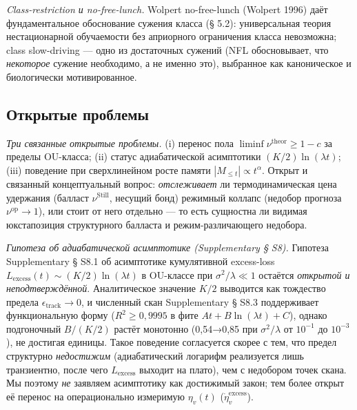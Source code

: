 \documentclass[pdflatex,sn-mathphys-ay]{sn-jnl}
\begin{document}
\emph{Class-restriction и no-free-lunch.} Wolpert no-free-lunch (Wolpert 1996) даёт фундаментальное обоснование сужения класса (§ 5.2): универсальная теория нестационарной обучаемости без априорного ограничения класса невозможна; class slow-driving --- одно из достаточных сужений (NFL обосновывает, что \emph{некоторое} сужение необходимо, а не именно это), выбранное как каноническое и биологически мотивированное.



\subsection{Открытые проблемы}\label{ux43eux442ux43aux440ux44bux442ux44bux435-ux43fux440ux43eux431ux43bux435ux43cux44b}



\emph{Три связанные открытые проблемы.} (i) перенос пола \(\liminf\nu^{\text{theor}} \ge 1-c\) за пределы OU-класса; (ii) статус адиабатической асимптотики \((K/2)\ln(\lambda t)\); (iii) поведение при сверхлинейном росте памяти \(|M_{\le t}| \propto t^\alpha\). Открыт и связанный концептуальный вопрос: \emph{отслеживает} ли термодинамическая цена удержания (балласт \(\nu^{\text{Still}}\), несущий бонд) режимный коллапс (недобор прогноза \(\nu^{\text{op}} \to 1\)), или стоит от него отдельно --- то есть сущностна ли видимая юкстапозиция структурного балласта и режим-различающего недобора.



\emph{Гипотеза об адиабатической асимптотике (Supplementary § S8).} Гипотеза Supplementary § S8.1 об асимптотике кумулятивной excess-loss \(L_{\text{excess}}(t) \sim (K/2)\ln(\lambda t)\) в OU-классе при \(\sigma^2/\lambda \ll 1\) остаётся \emph{открытой и неподтверждённой}. Аналитическое значение \(K/2\) выводится как тождество предела \(\epsilon_{\text{track}} \to 0\), и численный скан Supplementary § S8.3 поддерживает функциональную форму (\(R^2 \ge 0{,}9995\) в фите \(A t + B\ln(\lambda t) + C\)), однако подгоночный \(B/(K/2)\) растёт монотонно (0,54→0,85 при \(\sigma^2/\lambda\) от \(10^{-1}\) до \(10^{-3}\)), не достигая единицы. Такое поведение согласуется скорее с тем, что предел структурно \emph{недостижим} (адиабатический логарифм реализуется лишь транзиентно, после чего \(L_{\text{excess}}\) выходит на плато), чем с недобором точек скана. Мы поэтому \emph{не} заявляем асимптотику как достижимый закон; тем более открыт её перенос на операционально измеримую \(\eta_v(t)\) (\(\dot\eta_v^{\text{excess}}\)).
\end{document}
